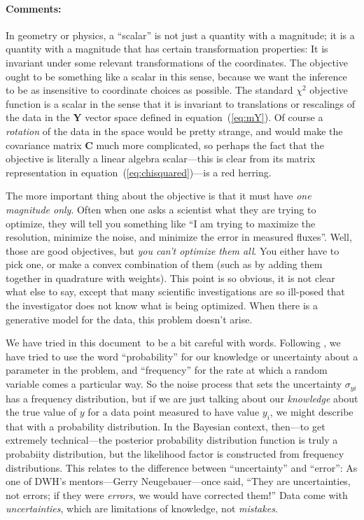 \documentclass[12pt,twoside]{article}
\newcommand{\documentname}{document}
\newcommand{\equationname}{equation}
\newcommand{\commentsname}{Comments}
\newcounter{problem}
\newenvironment{comments}{\paragraph{\commentsname:}}{}
\newcommand{\mmatrix}[1]{\boldsymbol{#1}}
\newcommand{\mC}{\mmatrix{C}}
\newcommand{\mY}{\mmatrix{Y}}
\begin{document}
\begin{comments}
In geometry or physics, a ``scalar'' is not just a quantity with a
magnitude; it is a quantity with a magnitude that has certain
transformation properties: It is invariant under some relevant
transformations of the coordinates.  The objective ought to be
something like a scalar in this sense, because we want the inference
to be as insensitive to coordinate choices as possible.  The standard
$\chi^2$ objective function is a scalar in the sense that it is
invariant to translations or rescalings of the data in the $\mY$
vector space defined in \equationname~(\ref{eq:mY}).  Of course a
\emph{rotation} of the data in the space would be pretty strange, and
would make the covariance matrix $\mC$ much more complicated, so
perhaps the fact that the objective is literally a linear algebra
scalar---this is clear from its matrix representation in
\equationname~(\ref{eq:chisquared})---is a red herring.

The more important thing about the objective is that it must have
\emph{one magnitude only}.  Often when one asks a scientist what they
are trying to optimize, they will tell you something like ``I am
trying to maximize the resolution, minimize the noise, and minimize
the error in measured fluxes''.  Well, those are good objectives, but
\emph{you can't optimize them all}.  You either have to pick one, or
make a convex combination of them (such as by adding them together in
quadrature with weights).  This point is so obvious, it is not clear
what else to say, except that many scientific investigations are so
ill-posed that the investigator does not know what is being optimized.
When there is a generative model for the data, this problem doesn't
arise.

We have tried in this \documentname\ to be a bit careful with words.
Following \citet{jaynes}, we have tried to use the word
``probability'' for our knowledge or uncertainty about a parameter in
the problem, and ``frequency'' for the rate at which a random variable
comes a particular way.  So the noise process that sets the
uncertainty $\sigma_{yi}$ has a frequency distribution, but if we are
just talking about our \emph{knowledge} about the true value of $y$
for a data point measured to have value $y_i$, we might describe that
with a probability distribution.  In the Bayesian context, then---to
get extremely technical---the posterior probability distribution
function is truly a probabiity distribution, but the likelihood factor
is constructed from frequency distributions.  This relates to the
difference between ``uncertainty'' and ``error'': As one of DWH's
mentors---Gerry Neugebauer---once said, ``They are uncertainties, not
errors; if they were \emph{errors}, we would have corrected them!''
Data come with \emph{uncertainties}, which are limitations of
knowledge, not \emph{mistakes}.


\end{comments}
\end{document}
